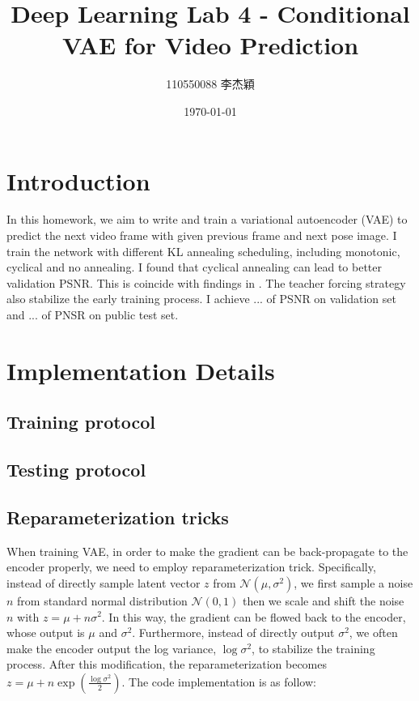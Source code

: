 \documentclass[twocolumn,a4paper]{article}
\title{Deep Learning Lab 4 - Conditional VAE for Video Prediction}
\author{110550088 李杰穎}
\date{\today}
\begin{document}
\maketitle

\section{Introduction}

In this homework, we aim to write and train a variational autoencoder (VAE) to predict the next video frame with given previous frame and next pose image. I train the network with different KL annealing scheduling, including monotonic, cyclical and no annealing. I found that cyclical annealing can lead to better validation PSNR. This is coincide with findings in \cite{fu2019cyclical}. The teacher forcing strategy also stabilize the early training process. I achieve ... of PSNR on validation set and ... of PNSR on public test set.


\section{Implementation Details}

\subsection{Training protocol}

\subsection{Testing protocol}

\subsection{Reparameterization tricks}

When training VAE, in order to make the gradient can be back-propagate to the encoder properly, we need to employ reparameterization trick. Specifically, instead of directly sample latent vector $z$ from $\mathcal{N}(\mu, \sigma^2)$, we first sample a noise $n$ from standard normal distribution $\mathcal{N}(0, 1)$ then we scale and shift the noise $n$ with $z = \mu + n \sigma^2$. In this way, the gradient can be flowed back to the encoder, whose output is $\mu$ and $\sigma^2$. Furthermore, instead of directly output $\sigma^2$, we often  make the encoder output the log variance, $\log \sigma^2$, to stabilize the training process. After this modification, the reparameterization becomes $z = \mu + n\exp(\frac{\log \sigma^2}{2})$. The code implementation is as follow:
\end{document}
